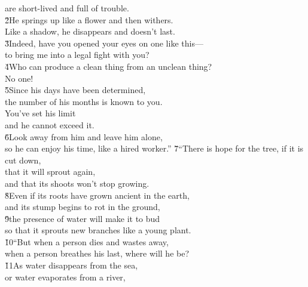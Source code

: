 \begin{poetry}
\poemll    are short-lived and full of trouble. \\
\poeml \v{2}He springs up like a flower and then withers. \\
\poemll    Like a shadow, he disappears and doesn't last. \\
\poeml \v{3}Indeed, have you opened your eyes on one like this--- \\
\poemll    to bring me into a legal fight with you? \\
\poeml \v{4}Who can produce a clean thing from an unclean thing? \\
\poemll    No one! \\
\poeml \v{5}Since his days have been determined, \\
\poemll    the number of his months is known to you. \\
\poeml You've set his limit \\
\poemll    and he cannot exceed it. \\
\poeml \v{6}Look away from him and leave him alone, \\
\poemll    so he can enjoy his time, like a hired worker.''
\poeml \v{7}``There is hope for the tree, if it is cut down, \\
\poemll    that it will sprout again, \\
\poemlll       and that its shoots won't stop growing. \\
\poeml \v{8}Even if its roots have grown ancient in the earth, \\
\poemll    and its stump begins to rot in the ground, \\
\poeml \v{9}the presence of water will make it to bud \\
\poemll    so that it sprouts new branches like a young plant. \\
\poeml \v{10}``But when a person dies and wastes away, \\
\poemll    when a person breathes his last, where will he be? \\
\poeml \v{11}As water disappears from the sea, \\
\poemll    or water evaporates from a river, \\

\end{poetry}
